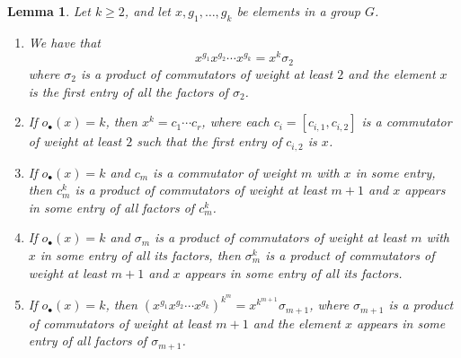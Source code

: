 \documentclass[12pt,leqno]{amsart}
\newtheorem{lem}[theorem]{\sc Lemma}
\theoremstyle{definition}
\begin{document}
\begin{lem} \label{lem:commutators-powers}
Let $k\geq 2$, and let $x, g_1,\ldots,g_k$ be elements in a group $G$.
\begin{enumerate}
    \item We have that  
    \[
    x^{g_1}x^{g_2}\cdots x^{g_k}=x^k\sigma_2
    \]
where $\sigma_2$ is a product of commutators of weight at least $2$ and the element $x$ is the first entry of all the factors of $\sigma_2$.
    \item If $o_{\bullet}(x)=k$, then  $x^{k}=c_1\cdots c_r$, where each $c_i=[c_{i,1},c_{i,2}]$ is a commutator of weight at least $2$ such that the first entry of $c_{i,2}$ is $x$.
    \item If $o_{\bullet}(x)=k$ and $c_m$ is a commutator of weight $m$ with $x$ in some entry, then $c_m^k$ is a product of commutators of weight at least $m+1$  and $x$ appears in some entry of all factors of $c_m^k$.
    \item If $o_{\bullet}(x)=k$ and $\sigma_m$ is a product of commutators of weight at least $m$ with $x$ in some entry of all its factors, then $\sigma_m^k$ is a product of commutators of weight at least $m+1$  and $x$ appears in some entry of all its factors.
    \item If $o_{\bullet}(x)=k$, then $(x^{g_1}x^{g_2}\cdots x^{g_k})^{k^m}=x^{k^{m+1}}\sigma_{m+1}$, where $\sigma_{m+1}$ is a product of commutators of weight at least $m+1$ and the element $x$ appears in some entry of all factors of $\sigma_{m+1}$.
  \end{enumerate}
\end{lem}
\end{document}
